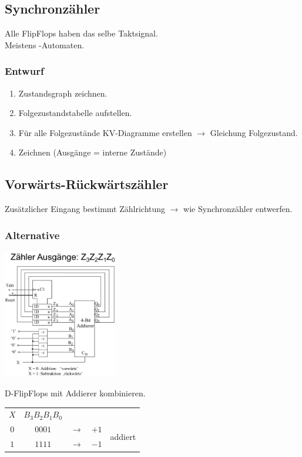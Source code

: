 \subsection{Synchronzähler}
Alle FlipFlops haben das selbe Taktsignal.\\
Meistens -Automaten.
\subsubsection{Entwurf}
\begin{enumerate}
    \item Zustandsgraph zeichnen.
    \item Folgezustandstabelle aufstellen.
    \item Für alle Folgezustände KV-Diagramme erstellen $\rightarrow$ Gleichung Folgezustand.
    \item Zeichnen (Ausgänge = interne Zustände)
\end{enumerate}

\subsection{Vorwärts-Rückwärtszähler}
Zusätzlicher Eingang bestimmt Zählrichtung $\rightarrow$ wie Synchronzähler entwerfen.
\subsubsection{Alternative}
\begin{center}
    \includegraphics[width = 50mm]{images/forward_back_count.JPG}
\end{center}
D-FlipFlops mit Addierer kombinieren.
\begin{flushleft}
    \begin{tabular}{c c c c l}
        $X$ & $B_3 B_2 B_1 B_0$ & & & \\
        $0$ & $0001$ & $\rightarrow$ & $+1$ & \multirow{2}{*}{addiert}\\
        $1$ & $1111$ & $\rightarrow$ & $-1$ & 
    \end{tabular}
\end{flushleft}